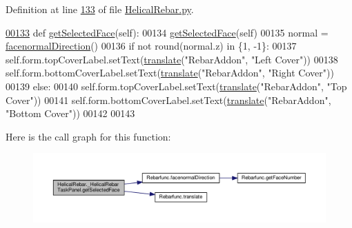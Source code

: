 Definition at line \hyperlink{HelicalRebar_8py_source_l00133}{133} of file \hyperlink{HelicalRebar_8py_source}{Helical\+Rebar.\+py}.


\begin{DoxyCode}
\hypertarget{classHelicalRebar_1_1__HelicalRebarTaskPanel.tex_l00133}{}\hyperlink{classHelicalRebar_1_1__HelicalRebarTaskPanel_aea514ce88bde89c57ab88576e7a27230}{00133}     \textcolor{keyword}{def }\hyperlink{classHelicalRebar_1_1__HelicalRebarTaskPanel_aea514ce88bde89c57ab88576e7a27230}{getSelectedFace}(self):
00134         \hyperlink{classHelicalRebar_1_1__HelicalRebarTaskPanel_aea514ce88bde89c57ab88576e7a27230}{getSelectedFace}(self)
00135         normal = \hyperlink{namespaceRebarfunc_a3a8c123c290609baec3a547c20a561b9}{facenormalDirection}()
00136         \textcolor{keywordflow}{if} \textcolor{keywordflow}{not} round(normal.z) \textcolor{keywordflow}{in} \{1, -1\}:
00137             self.form.topCoverLabel.setText(\hyperlink{namespaceRebarfunc_a1467a55852e36c36c472e222855bb937}{translate}(\textcolor{stringliteral}{"RebarAddon"}, \textcolor{stringliteral}{"Left Cover"}))
00138             self.form.bottomCoverLabel.setText(\hyperlink{namespaceRebarfunc_a1467a55852e36c36c472e222855bb937}{translate}(\textcolor{stringliteral}{"RebarAddon"}, \textcolor{stringliteral}{"Right Cover"}))
00139         \textcolor{keywordflow}{else}:
00140             self.form.topCoverLabel.setText(\hyperlink{namespaceRebarfunc_a1467a55852e36c36c472e222855bb937}{translate}(\textcolor{stringliteral}{"RebarAddon"}, \textcolor{stringliteral}{"Top Cover"}))
00141             self.form.bottomCoverLabel.setText(\hyperlink{namespaceRebarfunc_a1467a55852e36c36c472e222855bb937}{translate}(\textcolor{stringliteral}{"RebarAddon"}, \textcolor{stringliteral}{"Bottom Cover"}))
00142 
00143 
\end{DoxyCode}


Here is the call graph for this function\+:\nopagebreak
\begin{figure}[H]
\begin{center}
\leavevmode
\includegraphics[width=350pt]{classHelicalRebar_1_1__HelicalRebarTaskPanel_aea514ce88bde89c57ab88576e7a27230_cgraph}
\end{center}
\end{figure}


